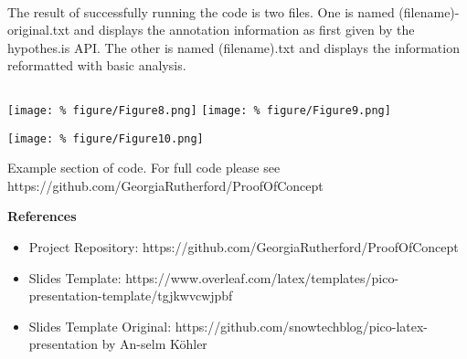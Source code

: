 \documentclass[unknownkeysallowed,usepdftitle=false, parskip=full]{beamer}
\newcommand{\secvariable}{nothing}
\newcommand{\mysection}[1]{\renewcommand{\secvariable}{#1}
}
\begin{document}
\begin{frame}\label{slabtable}
\begin{columns}
\begin{column}[t]{1.1\textwidth}
\hyperlink{slab}{}\\
The result of successfully running the code is two files. One is named (filename)-original.txt and displays the annotation information as first given by the hypothes.is API. The other is named (filename).txt and displays the information reformatted with basic analysis.



\vspace{0.3cm}
\end{column}
\end{columns}
%
\texttt{[image: \%
figure/Figure8.png]}\hspace{.05\textwidth}
\texttt{[image: \%
figure/Figure9.png]}
 
\vspace{0.2cm}

\end{frame}




\mysection{minor}
\begin{frame}\label{\secvariable} %
\begin{center}
\texttt{[image: \%
figure/Figure10.png]}
\end{center}
\vspace{-0.2cm}

Example section of code. For full code please see https://github.com/GeorgiaRutherford/ProofOfConcept

\end{frame}

\mysection{conclusion}
\begin{frame}\label{\secvariable}
\textbf{References}
 \vspace{12pt}

  \begin{itemize}
   \item Project Repository: https://github.com/GeorgiaRutherford/ProofOfConcept 
  \item Slides Template: https://www.overleaf.com/latex/templates/pico-presentation-template/tgjkwvcwjpbf
  \item Slides Template Original: https://github.com/snowtechblog/pico-latex-presentation by An-selm Köhler

  \end{itemize}

  
\end{frame}
\end{document}
